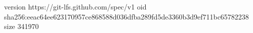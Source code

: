 version https://git-lfs.github.com/spec/v1
oid sha256:eeac64ee623170957ce868588d036dfba289fd5de3360b3d9ef711bc65782238
size 341970
